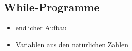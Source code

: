 \documentclass{bschlangaul-theorie}
\begin{document}
\subsection{While-Programme}

\begin{liQuellen}
\item \cite[Seite 7-12]{theo:fs:4}
\item \cite[Seite 260-264]{hoffmann}
\item \cite{wiki:while}
\end{liQuellen}

\begin{itemize}
\item endlicher Aufbau
\item Variablen aus den natürlichen Zahlen
\end{itemize}
\end{document}
